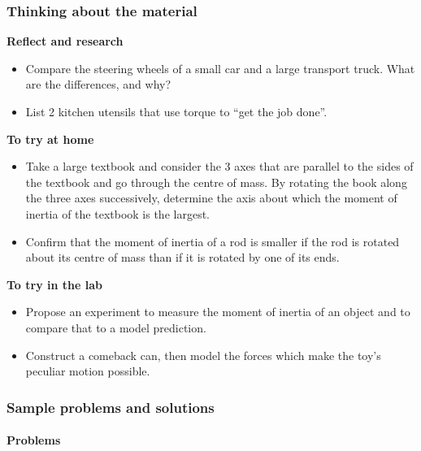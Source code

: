 \subsubsection{Thinking about the material}

\begin{framed}
\textbf{Reflect and research}\\
\begin{itemize}
\item Compare the steering wheels of a small car and a large transport truck. What are the differences, and why?
\item List 2 kitchen utensils that use torque to ``get the job done''.
\end{itemize}
\end{framed}

\begin{framed}
\textbf{To try at home}\\
\begin{itemize}
\item Take a large textbook and consider the 3 axes that are parallel to the sides of the textbook and go through the centre of mass. By rotating the book along the three axes successively, determine the axis about which the moment of inertia of the textbook is the largest.
\item Confirm that the moment of inertia of a rod is smaller if the rod is rotated about its centre of mass than if it is rotated by one of its ends.
\end{itemize}
\end{framed}

\begin{framed}
\textbf{To try in the lab}\\
\begin{itemize}
\item Propose an experiment to measure the moment of inertia of an object and to compare that to a model prediction.
\item Construct a comeback can, then model the forces which make the toy's peculiar motion possible.
\end{itemize}
\end{framed}

\subsubsection{Sample problems and solutions}

\paragraph{Problems}

